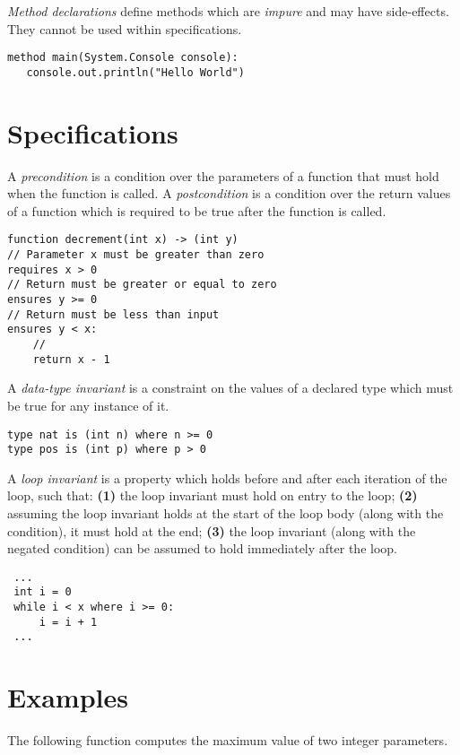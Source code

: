 \documentclass[a4paper,10pt,twcolumn]{article}
\begin{document}
{\em Method declarations} define methods which are {\em impure} and
may have side-effects.  They cannot be used within specifications.

\begin{lstlisting}
method main(System.Console console):
   console.out.println("Hello World")
\end{lstlisting}

\section*{Specifications}

A {\em precondition} is a condition over the parameters of a function
that must hold when the function is called.  A {\em
  postcondition} is a condition over the return values of a function
which is required to be true after the function is called.

\begin{lstlisting}
function decrement(int x) -> (int y) 
// Parameter x must be greater than zero
requires x > 0
// Return must be greater or equal to zero
ensures y >= 0
// Return must be less than input
ensures y < x:
    //
    return x - 1
\end{lstlisting}

A {\em data-type invariant} is a constraint on the values of a
declared type which must be true for any instance of it.

\begin{lstlisting}
type nat is (int n) where n >= 0
type pos is (int p) where p > 0
\end{lstlisting}

A {\em loop invariant} is a property which holds before and after each
iteration of the loop, such that: {\bf (1)} the loop invariant must hold on
entry to the loop; {\bf (2)} assuming the loop invariant holds at the start of
the loop body (along with the condition), it must hold at the end; {\bf (3)}
the loop invariant (along with the negated condition) can be assumed
to hold immediately after the loop.
\newline
\begin{lstlisting}
 ...
 int i = 0
 while i < x where i >= 0:
     i = i + 1 
 ...
\end{lstlisting}


\section*{Examples}

The following function computes the maximum value of two integer parameters.
\end{document}
